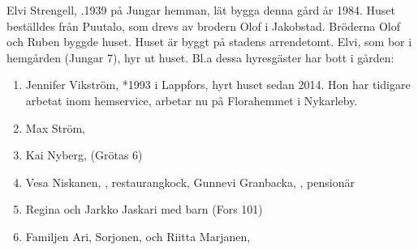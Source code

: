 Elvi Strengell, .1939 på Jungar hemman, lät bygga denna gård år 1984. Huset beställdes från Puutalo, som drevs av brodern Olof i Jakobstad. Bröderna Olof och Ruben byggde huset. Huset är byggt på stadens arrendetomt. Elvi, som bor i hemgården (Jungar 7), hyr ut huset. Bl.a dessa hyresgäster har bott i gården:
\begin{enumerate}
  \item Jennifer Vikström,  *1993 i Lappfors, hyrt huset sedan 2014. Hon har tidigare arbetat inom hemservice, arbetar nu på Florahemmet i Nykarleby.
  \item Max Ström, 
  \item Kai Nyberg,  (Grötas 6)
  \item Vesa Niskanen, , restaurangkock, Gunnevi Granbacka, , pensionär
  \item Regina  och Jarkko Jaskari med barn (Fors 101)
  \item Familjen Ari, Sorjonen,  och Riitta Marjanen, 
\end{enumerate}




